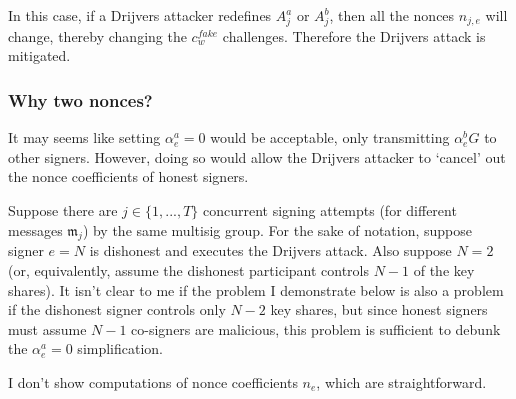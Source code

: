 In this case, if a Drijvers attacker redefines $A^a_j$ or $A^b_j$, then all the nonces $n_{j,e}$ will change, thereby changing the $c^{fake}_w$ challenges. Therefore the Drijvers attack is mitigated.

\subsubsection*{Why two nonces?}

It may seems like setting $\alpha^a_e = 0$ would be acceptable, only transmitting $\alpha^b_e G$ to other signers. However, doing so would allow the Drijvers attacker to `cancel' out the nonce coefficients of honest signers.

Suppose there are $j \in \{1,...,T\}$ concurrent signing attempts (for different messages $\mathfrak{m}_j$) by the same multisig group. For the sake of notation, suppose signer $e = N$ is dishonest and executes the Drijvers attack. Also suppose $N = 2$ (or, equivalently, assume the dishonest participant controls $N - 1$ of the key shares). It isn't clear to me if the problem I demonstrate below is also a problem if the dishonest signer controls only $N - 2$ key shares, but since honest signers must assume $N - 1$ co-signers are malicious, this problem is sufficient to debunk the $\alpha^a_e = 0$ simplification.

I don't show computations of nonce coefficients $n_e$, which are straightforward.

